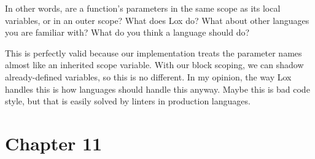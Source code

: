 \documentclass{article}
\begin{document}
\begin{enumerate}
{        In other words, are a function’s parameters in the same scope as its local variables, or in an outer scope? What does Lox do? What about other languages you are familiar with? What do you think a language should do?

        This is perfectly valid because our implementation treats the parameter 
        names almost like an inherited scope variable. With our block scoping, 
        we can shadow already-defined variables, so this is no different. In my 
        opinion, the way Lox handles this is how languages should handle this anyway.
        Maybe this is bad code style, but that is easily solved by linters in production
        languages.
    }
\end{enumerate}

\section*{Chapter 11}
\end{document}
